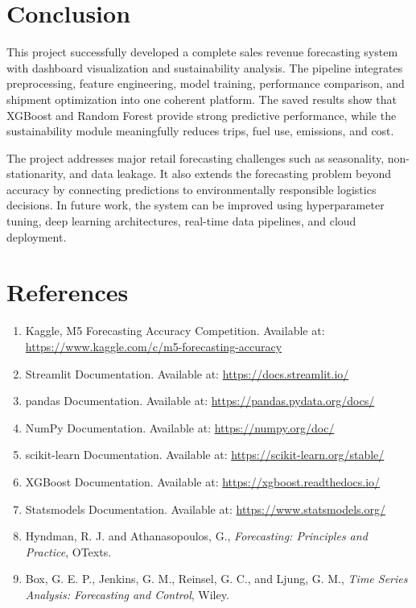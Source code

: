 \documentclass[12pt,a4paper]{article}
\begin{document}
\section{Conclusion}
This project successfully developed a complete sales revenue forecasting system with dashboard visualization and sustainability analysis. The pipeline integrates preprocessing, feature engineering, model training, performance comparison, and shipment optimization into one coherent platform. The saved results show that XGBoost and Random Forest provide strong predictive performance, while the sustainability module meaningfully reduces trips, fuel use, emissions, and cost.

The project addresses major retail forecasting challenges such as seasonality, non-stationarity, and data leakage. It also extends the forecasting problem beyond accuracy by connecting predictions to environmentally responsible logistics decisions. In future work, the system can be improved using hyperparameter tuning, deep learning architectures, real-time data pipelines, and cloud deployment.

\section{References}
\begin{enumerate}[leftmargin=*]
    \item Kaggle, M5 Forecasting Accuracy Competition. Available at: \url{https://www.kaggle.com/c/m5-forecasting-accuracy}
    \item Streamlit Documentation. Available at: \url{https://docs.streamlit.io/}
    \item pandas Documentation. Available at: \url{https://pandas.pydata.org/docs/}
    \item NumPy Documentation. Available at: \url{https://numpy.org/doc/}
    \item scikit-learn Documentation. Available at: \url{https://scikit-learn.org/stable/}
    \item XGBoost Documentation. Available at: \url{https://xgboost.readthedocs.io/}
    \item Statsmodels Documentation. Available at: \url{https://www.statsmodels.org/}
    \item Hyndman, R. J. and Athanasopoulos, G., \textit{Forecasting: Principles and Practice}, OTexts.
    \item Box, G. E. P., Jenkins, G. M., Reinsel, G. C., and Ljung, G. M., \textit{Time Series Analysis: Forecasting and Control}, Wiley.
\end{enumerate}
\end{document}
